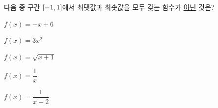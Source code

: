 다음 중 구간 $[-1{,}\mkern3mu\mathopen{}1]$에서 최댓값과 최솟값을 모두 갖는 함수가 \underline{아닌} 것은?
\begin{choicesii}{\rule[-3ex]{0pt}{8ex}$f(x)=-x+6$}{\rule[-3ex]{0pt}{8ex}$f(x)=3x^2$}{\rule[-3ex]{0pt}{8ex}$f(x)=\sqrt{x+1}$}{\rule[-3ex]{0pt}{8ex}$f(x)=\dfrac{1}{x}$}{\rule[-3ex]{0pt}{8ex}$f(x)=\dfrac{1}{x-2}$}\end{choicesii}
